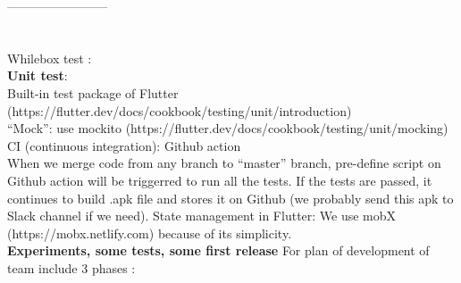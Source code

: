 \documentclass{article}
\begin{document}
       ------------------------\\ \\ \\
    Whilebox test :   \\
    \textbf{Unit test}: \\
        Built-in test package of Flutter (https://flutter.dev/docs/cookbook/testing/unit/introduction) \\
        “Mock”: use mockito (https://flutter.dev/docs/cookbook/testing/unit/mocking) \\
        CI (continuous integration): Github action \\
        When we merge code from any branch to “master” branch, pre-define script on Github action will be triggerred to run all the tests. If the tests are passed, it continues to build .apk file and stores it on Github (we probably send this apk to Slack channel if we need).
        State management in Flutter: We use mobX (https://mobx.netlify.com) because of its simplicity.\\
\textbf{Experiments, some tests, some first release} 
    For plan of development of team include 3 phases :   
\end{document}
